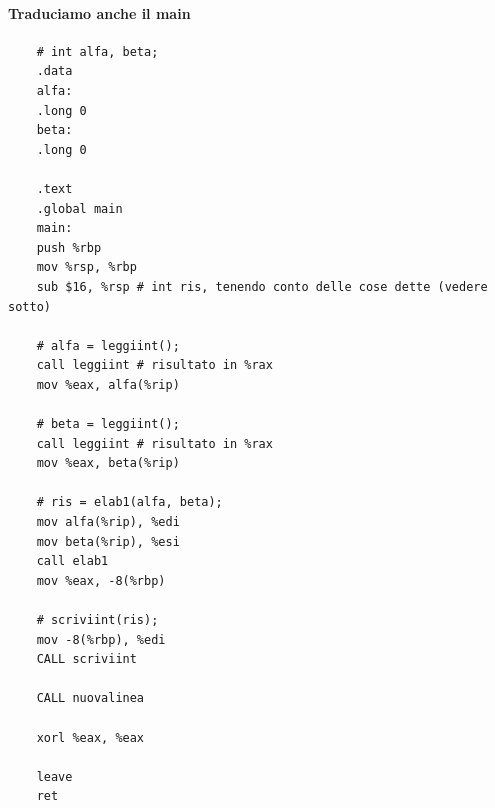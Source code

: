 \paragraph{Traduciamo anche il main}
\begin{verbatim}
	# int alfa, beta;
	.data
	alfa:
	.long 0
	beta:
	.long 0
	
	.text
	.global main
	main:
	push %rbp
	mov %rsp, %rbp
	sub $16, %rsp # int ris, tenendo conto delle cose dette (vedere sotto)
	
	# alfa = leggiint();
	call leggiint # risultato in %rax
	mov %eax, alfa(%rip)
	
	# beta = leggiint();
	call leggiint # risultato in %rax
	mov %eax, beta(%rip)
	
	# ris = elab1(alfa, beta);
	mov alfa(%rip), %edi
	mov beta(%rip), %esi
	call elab1
	mov %eax, -8(%rbp)
	
	# scriviint(ris);
	mov -8(%rbp), %edi
	CALL scriviint
	
	CALL nuovalinea
	
	xorl %eax, %eax
	
	leave
	ret
\end{verbatim}
